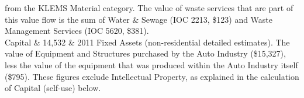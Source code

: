 \begin{longtabu}
											from the KLEMS Material
											category.
											The value of waste services that are part 
											of this value flow 
											is the sum of Water \& Sewage (IOC 2213, \$123) 
											and Waste Management Services (IOC 5620, \$381).    \\
Capital             &  14,532      	&   	2011  Fixed Assets (non-residential detailed estimates).
											The  value of Equipment
											and Structures purchased by the Auto Industry (\$15,327), 
											less the value of the equipment 
											that was produced within 
											the Auto Industry itself (\$795). 
											These figures exclude Intellectual Property, 
											as explained in
											the calculation of Capital (self-use) below.     	\\  
 

\end{longtabu}
